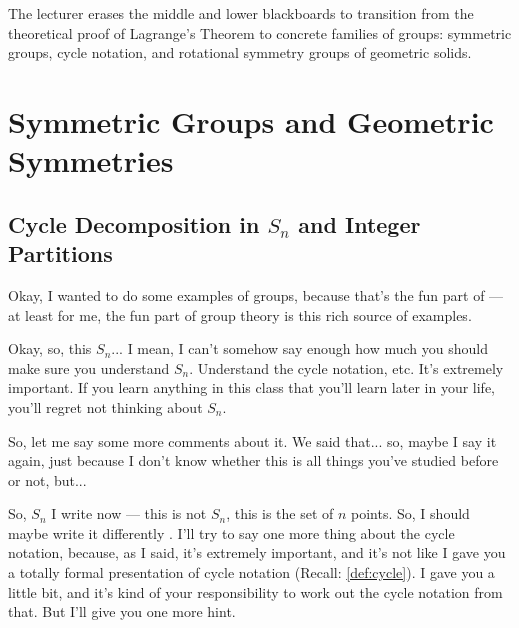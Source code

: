 \begin{note}
The lecturer erases the middle and lower blackboards to transition from the theoretical proof of Lagrange's Theorem to concrete families of groups: symmetric groups, cycle notation, and rotational symmetry groups of geometric solids.
\end{note}

\section{Symmetric Groups and Geometric Symmetries}

\subsection{Cycle Decomposition in \texorpdfstring{$S_n$}{Sn} and Integer Partitions}

\begin{speech}[00:28:02 - 00:29:27]
Okay, I wanted to do some examples of groups, because that's the fun part of --- at least for me, the fun part of group theory is this rich source of examples.

Okay, so, this $S_n$... I mean, I can't somehow say enough how much you should make sure you understand $S_n$. Understand the cycle notation, etc. It's extremely important. If you learn anything in this class that you'll learn later in your life, you'll regret not thinking about $S_n$.

So, let me say some more comments about it. We said that... so, maybe I say it again, just because I don't know whether this is all things you've studied before or not, but...

So, $S_n$ I write now  --- this is not $S_n$, this is the set of $n$ points. So, I should maybe write it differently . I'll try to say one more thing about the cycle notation, because, as I said, it's extremely important, and it's not like I gave you a totally formal presentation of cycle notation (Recall: \cref{def:cycle}). I gave you a little bit, and it's kind of your responsibility to work out the cycle notation from that. But I'll give you one more hint.
\end{speech}


